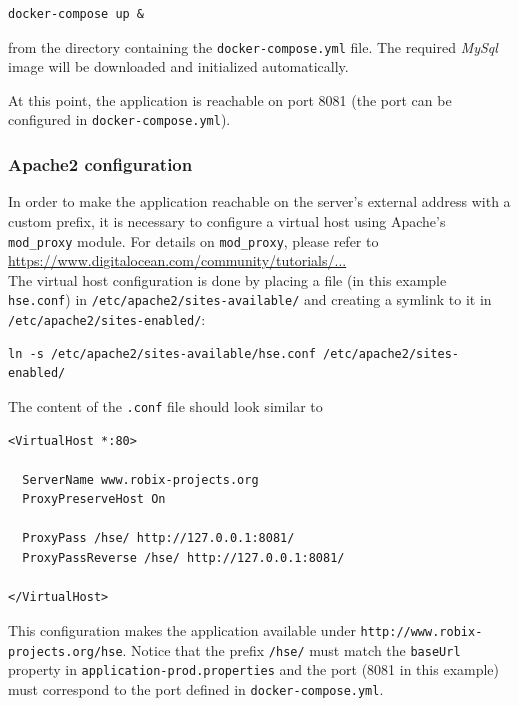 \documentclass[fleqn]{article}
\begin{document}
\begin{verbatim}
docker-compose up &
\end{verbatim}

from the directory containing the \texttt{docker-compose.yml} file. The required \emph{MySql} image will
be downloaded and initialized automatically.

At this point, the application is reachable on port 8081 (the port can be configured in \texttt{docker-compose.yml}).

\subsubsection{Apache2 configuration}

In order to make the application reachable on the server's external address with a custom prefix, it is necessary to
configure a virtual host using Apache's \texttt{mod\_proxy} module. For details on \texttt{mod\_proxy}, please
refer to \\ \href{https://www.digitalocean.com/community/tutorials/how-to-use-apache-http-server-as-reverse-proxy-using-mod_proxy-extension}{https://www.digitalocean.com/community/tutorials/...} \\

The virtual host configuration is done by placing a file (in this example \texttt{hse.conf}) in \texttt{/etc/apache2/sites-available/} and creating
a symlink to it in \texttt{/etc/apache2/sites-enabled/}:

\begin{verbatim}
ln -s /etc/apache2/sites-available/hse.conf /etc/apache2/sites-enabled/
\end{verbatim}

The content of the \texttt{.conf} file should look similar to

\begin{verbatim}
<VirtualHost *:80>

  ServerName www.robix-projects.org
  ProxyPreserveHost On

  ProxyPass /hse/ http://127.0.0.1:8081/
  ProxyPassReverse /hse/ http://127.0.0.1:8081/

</VirtualHost>
\end{verbatim}

This configuration makes the application available under \texttt{http://www.robix-projects.org/hse}. Notice that
the prefix \texttt{/hse/} must match the \texttt{baseUrl} property in \texttt{application-prod.properties}
and the port (8081 in this example) must correspond to the port defined in \texttt{docker-compose.yml}. 
\end{document}
